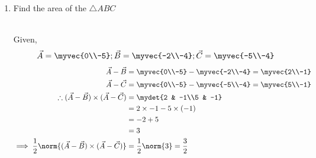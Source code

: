 \documentclass[11pt]{book}
\begin{document}
\begin{enumerate}[label=\thesection.\arabic*.,ref=\thesection.\theenumi]
\item Find the area of the $\triangle ABC$

	\solution\\
Given,
\begin{align}
 \vec{A} = \myvec{0\\-5};
 \vec{B} = \myvec{-2\\-4};
 \vec{C} = \myvec{-5\\-4}
 \end{align}
 \begin{align}
 \vec{A}-\vec{B} &= \myvec{0\\-5} - \myvec{-2\\-4} = \myvec{2\\-1}\\
 \vec{A}-\vec{C} &= \myvec{0\\-5} - \myvec{-5\\-4} = \myvec{5\\-1}\\
\therefore(\vec{A}-\vec{B})\times(\vec{A}-\vec{C}) 
 &= \mydet{2 & -1\\5 & -1}\\
 &= 2 \times -1 - 5 \times (-1)\\ &= -2 + 5\\ &= 3\\
 \implies\frac{1}{2}\norm{(\vec{A}-\vec{B})\times(\vec{A}-\vec{C})} &= \frac{1}{2}\norm{3}= \frac{3}{2}
\end{align}


\end{enumerate}
\end{document}
